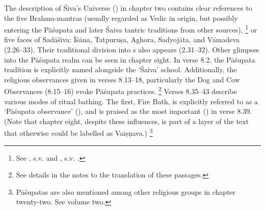 The description of Śiva's Universe () in chapter two contains clear references to the five Brahma-mantras (usually regarded as Vedic in origin, but possibly entering the Pāśupata and later Śaiva tantric traditions from other sources),%
				\footnote{See \TAKIII, s.v. 
				 and \TAKIV, s.v.
				.\nocite{TAK3}\nocite{TAK4}}
or five faces of Sadāśiva: Īśāna, Tatpuruṣa, Aghora, Sadyojāta, and Vāmadeva (2.26--33). Their traditional division into s also appears (2.31--32). 
Other glimpses into the Pāśupata realm can be seen in chapter eight. In verse 8.2, the Pāśupata tradition is explicitly named alongside the `Śaiva' school. Additionally, the religious observances given in verses 8.13--18, particularly the Dog and Cow Observances (8.15--16) evoke Pāśupata practices.%
			\footnote{See details in the notes to the
								translation of these passages.}
Verses 8.35--43 describe various modes of ritual bathing. The first, Fire Bath, is explicitly referred to as a `Pāśupata observance' (), and is praised as the most important () in verse 8.39. (Note that chapter eight, despite these influences, is part of a layer of the text that otherwise could be labelled as Vaiṣṇava.)%
				\footnote{Pāśupatas are also mentioned among 	
					other religious groups in chapter twenty-two.
					See volume two.}

